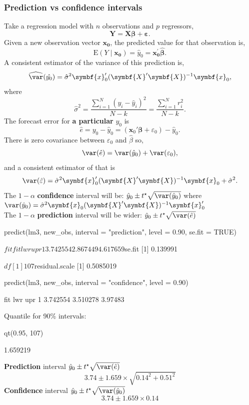 \documentclass[a4paper]{article}
\begin{document}
\subsubsection{Prediction vs confidence intervals}
Take a regression model with \( n \) observations and \( p \) regressors,
\[
	\symbf{Y} = \symbf{X}\symbf{\beta} + \symbf{\varepsilon}.
\]
Given a new observation vector \( \symbf{x}_{\textbf{0}} \), the predicted value for that observation is,
\[
	\mathrm{E} (Y \mid \symbf{x}_{\textbf{0}}) = \hat{y}_0 = \symbf{x}_{\textbf{0}}^\prime \symbf{\hat{\beta}}.
\]
A consistent estimator of the variance of this prediction is,
\[
	\widehat{\var}(\hat{y_0}) = \hat{\sigma}^2 \symbf{x}_0'(\symbf{X}^\prime \symbf{X})^{-1}\symbf{x}_0,
\]
where
\[
	\hat{\sigma}^2=\frac{\sum_{i=1}^{N} (y_i-\hat{y}_i)^2}{N-k} = \frac{\sum_{i=1}^{N} r_i^2}{N-k}.
\]
The forecast error for \textbf{a particular} \( y_0 \) is
\[
	\hat{e} = y_0 - \hat{y}_0 = (\symbf{x}_0' \symbf{\beta} + \varepsilon_0) - \hat{y}_0.
\] 
There is zero covariance between \( \varepsilon_0 \) and \( \hat{\beta} \) so,
\[
	\var(\hat{e}) = \var(\hat{y}_0) + \var(\varepsilon_0),
\]
and a consistent estimator of that is
\[
	\var(\hat{\varepsilon}) = \hat{\sigma}^2 \symbf{x}_0^\prime (\symbf{X}^\prime \symbf{X})^{-1} \symbf{x}_0 + \hat{\sigma}^2.
\]
The \( 1-\alpha \) \textbf{confidence} interval will be: \( \hat{y}_0 \pm t^\star \sqrt{\var(\hat{y}_0)} \) where \( \var(\hat{y}_0) = \hat{\sigma}^2 \symbf{x}_0(\symbf{X}^\prime \symbf{X})^{-1}\symbf{x}_0^\prime \)\\
The \( 1-\alpha \) \textbf{prediction} interval will be wider: \( \hat{y}_0 \pm t^\star \sqrt{\var(\hat{e})} \) 
\begin{Schunk}
\begin{Sinput}
predict(lm3, new_obs, 
        interval = "prediction",
        level = 0.90, se.fit = TRUE)
\end{Sinput}
\begin{Soutput}
$fit
       fit      lwr      upr
1 3.742554 2.867449 4.617659

$se.fit
[1] 0.139991

$df
[1] 107

$residual.scale
[1] 0.5085019
\end{Soutput}
\begin{Sinput}
predict(lm3, new_obs, 
        interval = "confidence",
        level = 0.90)
\end{Sinput}
\begin{Soutput}
       fit      lwr     upr
1 3.742554 3.510278 3.97483
\end{Soutput}
\end{Schunk}
Quantile for 90\% intervals:
\begin{Schunk}
\begin{Sinput}
qt(0.95, 107)
\end{Sinput}
\begin{Soutput}
[1] 1.659219
\end{Soutput}
\end{Schunk}
\textbf{Prediction} interval \( \hat{y}_0 \pm t^\star \sqrt{\var(\hat{e})} \)
\[
	3.74 \pm 1.659 \times \sqrt{0.14^2 + 0.51^2}
\]
\textbf{Confidence} interval \( \hat{y}_0 \pm t^\star \sqrt{\var(\hat{y}_0)} \)
\[
	3.74 \pm 1.659 \times 0.14
\]
\end{document}
